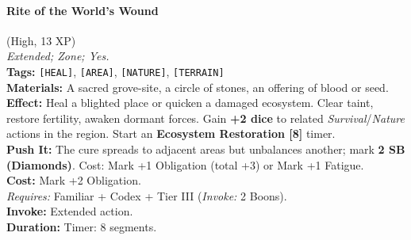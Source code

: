 \paragraph{Rite of the World's Wound} (High, 13 XP) \hfill \\
\emph{Extended; Zone; Yes.} \\
\textbf{Tags:} \texttt{[HEAL]}, \texttt{[AREA]}, \texttt{[NATURE]}, \texttt{[TERRAIN]} \\
\textbf{Materials:} A sacred grove-site, a circle of stones, an offering of blood or seed. \\
\textbf{Effect:} Heal a blighted place or quicken a damaged ecosystem. Clear taint, restore fertility, awaken dormant forces. Gain \textbf{+2 dice} to related \textit{Survival}/\textit{Nature} actions in the region. Start an \textbf{Ecosystem Restoration [8]} timer. \\
\textbf{Push It:} The cure spreads to adjacent areas but unbalances another; mark \textbf{2 SB (Diamonds)}. Cost: Mark +1 Obligation (total +3) or Mark +1 Fatigue. \\
\textbf{Cost:} Mark +2 Obligation. \\
\textit{Requires:} Familiar + Codex + Tier III (\textit{Invoke:} 2 Boons). \\
\textbf{Invoke:} Extended action. \\
\textbf{Duration:} Timer: 8 segments.

